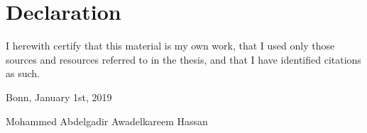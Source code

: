 \documentclass[../structure.tex]{subfiles}
\begin{document}
\chapter*{Declaration}
I herewith certify that this material is my own work, that I used only
those sources and resources referred to in the thesis, and that I have
identified citations as such.

 \vspace{2cm}
Bonn, January 1st, 2019

 \vspace{2cm}
Mohammed Abdelgadir Awadelkareem Hassan
\end{document}

